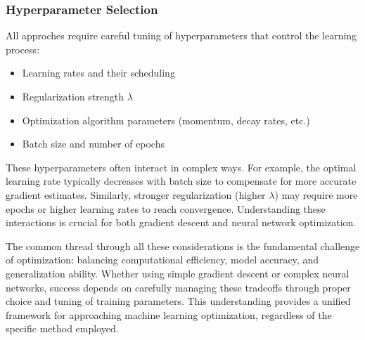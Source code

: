 \subsubsection{Hyperparameter Selection}
All approches require careful tuning of hyperparameters that control the learning process:
\begin{itemize}
    \item Learning rates and their scheduling
    \item Regularization strength \( \lambda \)
    \item Optimization algorithm parameters (momentum, decay rates, etc.)
    \item Batch size and number of epochs
\end{itemize}

These hyperparameters often interact in complex ways. For example, the optimal learning rate typically decreases with batch size to compensate for more accurate gradient estimates. Similarly, stronger regularization (higher \( \lambda \)) may require more epochs or higher learning rates to reach convergence. Understanding these interactions is crucial for both gradient descent and neural network optimization.

The common thread through all these considerations is the fundamental challenge of optimization: balancing computational efficiency, model accuracy, and generalization ability. Whether using simple gradient descent or complex neural networks, success depends on carefully managing these tradeoffs through proper choice and tuning of training parameters. This understanding provides a unified framework for approaching machine learning optimization, regardless of the specific method employed.